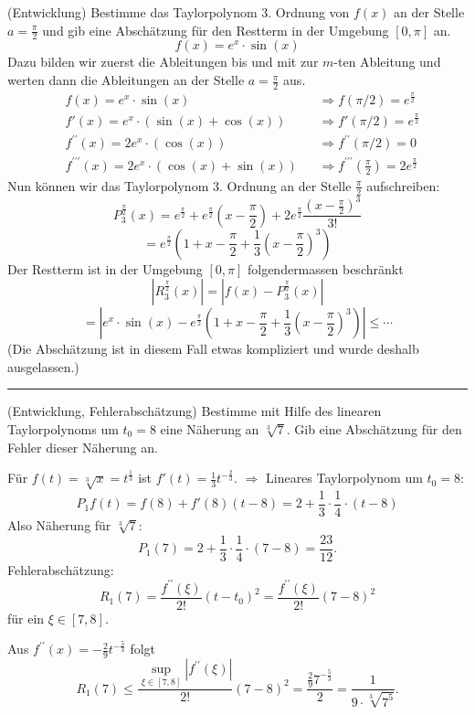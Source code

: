 \documentclass[a4paper,landscape,8pt]{extarticle}
\newcommand{\abs}[1]{\left\lvert #1 \right\rvert}
\newcommand{\sep}{\vspace{5pt}\noindent\hrule\vspace{5pt}}
\begin{document}
\begin{multicols*}{4}
\begin{warmup}
\Bsp (Entwicklung) Bestimme das Taylorpolynom 3. Ordnung von $f(x)$ an der
Stelle $a=\frac{\pi}{2}$ und gib eine Abschätzung für den Restterm in der
Umgebung $[0,\pi]$ an.
\[
f(x)=e^x\cdot \sin(x)
\]
Dazu bilden wir zuerst die Ableitungen bis und mit zur $m$-ten Ableitung und
werten dann die Ableitungen an der Stelle $a=\frac{\pi}{2}$ aus.
\begin{align*}
&f(x)=e^x\cdot \sin(x) &&\Longrightarrow f(\pi/2)=e^{\frac{\pi}{2}}\\
&f'(x)=e^x\cdot(\sin(x) + \cos(x)) && \Longrightarrow f'(\pi/2)=e^{\frac{\pi}{2}}\\
&f^{\prime\prime}(x)=2e^x\cdot(\cos(x)) && \Longrightarrow f^{\prime\prime}(\pi/2)=0\\
&f^{\prime\prime\prime}(x)=2e^x\cdot(\cos(x) + \sin(x)) && \Longrightarrow
f^{\prime\prime\prime}(\frac{\pi}{2}) =2e^{\frac{\pi}{2}}
\end{align*}
Nun können wir das Taylorpolynom 3. Ordnung an der Stelle $\frac{\pi}{2}$
aufschreiben:
\[
P^{\frac{\pi}{2}}_3(x)=e^{\frac{\pi}{2}} + e^{\frac{\pi}{2}}(x-\frac{\pi}{2}) 
+ 2e^{\frac{\pi}{2}}\frac{(x-\frac{\pi}{2})^3}{3!}
\]
\[
=e^{\frac{\pi}{2}}\left(1 + x - \frac{\pi}{2}
+\frac{1}{3}(x-\frac{\pi}{2})^3\right)
\]
Der Restterm ist in der Umgebung $[0,\pi]$ folgendermassen beschränkt
\[
\abs{R^{\frac{\pi}{2}}_3(x)} = \abs{f(x)-P^{\frac{\pi}{2}}_3(x)}
\]
\[
=\abs{e^x\cdot\sin(x) - e^{\frac{\pi}{2}}\left(1 + x - \frac{\pi}{2}
+\frac{1}{3}(x-\frac{\pi}{2})^3\right)}
\leq \cdots
\]
(Die Abschätzung ist in diesem Fall etwas kompliziert und wurde deshalb
ausgelassen.)

\sep

\Bsp (Entwicklung, Fehlerabschätzung) Bestimme mit Hilfe des linearen
Taylorpolynoms um $t_0=8$ eine Näherung an $\sqrt[3]{7}$. Gib eine Abschätzung
für den Fehler dieser Näherung an.

Für $f(t)=\sqrt[3]{x}=t^{\frac{1}{3}}$ ist $f'(t)=\frac{1}{3}t^{-\frac{2}{3}}$.
$\Longrightarrow$ Lineares Taylorpolynom um $t_0=8$:
\[
P_1f(t)=f(8) + f'(8)(t-8) = 2 + \frac{1}{3}\cdot\frac{1}{4}\cdot(t-8)
\]
Also Näherung für $\sqrt[3]{7}$:
\[
P_1(7) = 2+\frac{1}{3}\cdot\frac{1}{4}\cdot(7-8) = \frac{23}{12}. 
\]
Fehlerabschätzung:
\[
R_1(7) = \frac{f^{\prime\prime}(\xi)}{2!}(t-t_0)^2 
= \frac{f^{\prime\prime}(\xi)}{2!}(7-8)^2
\]
für ein $\xi\in[7,8]$.

Aus $f^{\prime\prime}(x)=-\frac{2}{9}t^{-\frac{5}{3}}$ folgt
\[
R_1(7) \leq \frac{ \sup_{\xi\in[7,8]}\abs{f^{\prime\prime}(\xi)}}{2!}(7-8)^2
= \frac{\frac{2}{9}7^{-\frac{5}{3}}}{2}
= \frac{1}{9\cdot\sqrt[3]{7^5}}.
\]


\end{warmup}
\end{multicols*}
\end{document}
